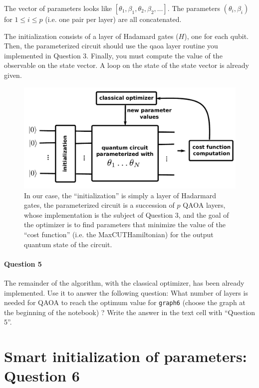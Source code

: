 \documentclass{article}
\newcommand{\maxcut}{{\sc MaxCUT}}
\begin{document}
The vector of parameters looks like $[\theta_1, \beta_1, \theta_2, \beta_2,\dots]$. The parameters $(\theta_i,\beta_i)$ for 
$1\leq i \leq p$ (i.e. one pair per layer) are all concatenated.


The initialization consists of a layer of Hadamard gates ($H$), one for each qubit.
Then, the parameterized circuit should use the qaoa layer routine you implemented in Question $3$.
Finally, you must compute the value of the observable on the state vector. A loop on the state of the state vector
is already given.

\begin{figure}

\includegraphics[width=\textwidth]{qaoa.pdf}

\caption{In our case, the ``initialization'' is simply a layer of Hadarmard gates, the parameterized circuit is a succession
    of $p$ QAOA layers, whose implementation is the subject of Question 3, and the goal of the optimizer is
    to find parameters that minimize the value of the ``cost function'' (i.e. the \maxcut  Hamiltonian) for the output
    quantum state of the circuit.}
\label{qaoa}
\end{figure}

\paragraph{Question 5} The remainder of the algorithm, with the classical optimizer, has been already implemented. Use it
to answer the following question: What number of layers is needed for QAOA to reach the optimum value 
for {\tt graph6} (choose the graph at the beginning of the notebook) ? Write the answer in the text cell with ``Question 5''.

\section{Smart initialization of parameters: Question 6}
\end{document}
